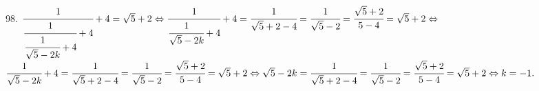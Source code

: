 98. $\cfrac{1}{\cfrac{1}{\cfrac{1}{\sqrt{5}-2k}+4}+4}+4=\sqrt{5}+2\Leftrightarrow
\cfrac{1}{\cfrac{1}{\sqrt{5}-2k}+4}+4=\cfrac{1}{\sqrt{5}+2-4}=\cfrac{1}{\sqrt{5}-2}=\cfrac{\sqrt{5}+2}{5-4}=\sqrt{5}+2\Leftrightarrow$\\$
\cfrac{1}{\sqrt{5}-2k}+4=\cfrac{1}{\sqrt{5}+2-4}=\cfrac{1}{\sqrt{5}-2}=\cfrac{\sqrt{5}+2}{5-4}=\sqrt{5}+2\Leftrightarrow
\sqrt{5}-2k=\cfrac{1}{\sqrt{5}+2-4}=\cfrac{1}{\sqrt{5}-2}=\cfrac{\sqrt{5}+2}{5-4}=\sqrt{5}+2\Leftrightarrow k=-1.$\\
